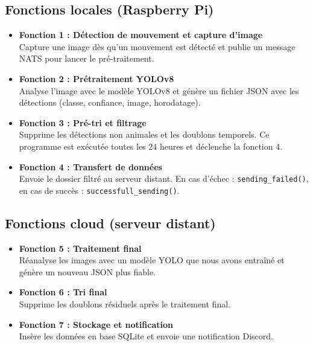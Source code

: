 \documentclass[a4paper,11pt]{article}
\begin{document}
	\subsection{Fonctions locales (Raspberry Pi)}
	\begin{itemize}
		\item \textbf{Fonction 1 : Détection de mouvement et capture d’image} \\
		Capture une image dès qu'un mouvement est détecté et publie un message NATS pour lancer le pré-traitement.
		
		\item \textbf{Fonction 2 : Prétraitement YOLOv8} \\
		Analyse l’image avec le modèle YOLOv8 et génère un fichier JSON avec les détections (classe, confiance, image, horodatage).
		
		\item \textbf{Fonction 3 : Pré-tri et filtrage} \\
		Supprime les détections non animales et les doublons temporels. Ce programme est exécutée toutes les 24 heures et déclenche la fonction 4.
		
		\item \textbf{Fonction 4 : Transfert de données} \\
		Envoie le dossier filtré au serveur distant. En cas d'échec : \texttt{sending\_failed()}, en cas de succès : \texttt{successfull\_sending()}.
	\end{itemize}
	
	\subsection{Fonctions cloud (serveur distant)}
	\begin{itemize}
		\item \textbf{Fonction 5 : Traitement final} \\
		Réanalyse les images avec un modèle YOLO que nous avons entraîné et génère un nouveau JSON plus fiable.
		
		\item \textbf{Fonction 6 : Tri final} \\
		Supprime les doublons résiduels après le traitement final.
		
		\item \textbf{Fonction 7 : Stockage et notification} \\
		Insère les données en base SQLite et envoie une notification Discord.
	\end{itemize}
	
\end{document}
